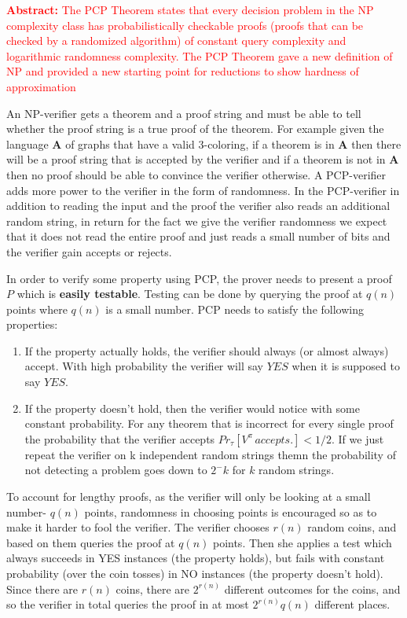 \textcolor{red}{\textbf{Abstract:} The PCP Theorem states that every decision problem in the NP complexity class has probabilistically checkable proofs (proofs that can be checked by a randomized algorithm) of constant query complexity and logarithmic randomness complexity. The PCP Theorem gave a new definition of NP and provided a new starting point for reductions to show hardness of approximation}

An NP-verifier gets a theorem and a proof string and must be able to tell whether the proof string is a true proof of the theorem. For example given the language $\bm{A}$ of graphs that have a valid 3-coloring, if a theorem is in $\bm{A}$ then there will be a proof string that is accepted by the verifier and if a theorem is not in $\bm{A}$ then no proof should be able to convince the verifier otherwise. A PCP-verifier adds more power to the verifier in the form of randomness. In the PCP-verifier in addition to reading the input and the proof the verifier also reads an additional random string, in return for the fact we give the verifier randomness we expect that it does not read the entire proof and just reads a small number of bits and the verifier gain accepts or rejects.

In order to verify some property using PCP, the prover needs to present a proof $P$ which is \textbf{easily testable}. Testing can be done by querying the proof at $q(n)$ points where $q(n)$ is a small number. PCP needs to satisfy the following properties: 
\begin{enumerate}[nolistsep]
    \item If the property actually holds, the verifier should always (or almost always) accept. With high probability the verifier will say $YES$ when it is supposed to say $YES$.
    \item If the property doesn't hold, then the verifier would notice with some constant probability. For any theorem that is incorrect for every single proof the probability that the verifier accepts $Pr_{\tau}[V^{\pi}\,accepts.] < 1/2$. If we just repeat the verifier on k independent random strings themn the probability of not detecting a problem goes down to $2^-k$ for $k$ random strings.
\end{enumerate}

To account for lengthy proofs, as the verifier will only be looking at a small number- $q(n)$ points, randomness in choosing points is encouraged so as to make it harder to fool the verifier. The verifier chooses $r(n)$ random coins, and based on them queries the proof at $q(n)$ points. Then she applies a test which always succeeds in YES instances (the property holds), but fails with constant probability (over the coin tosses) in NO instances (the property doesn't hold). Since there are $r(n)$ coins, there are $2^{r(n)}$ different outcomes for the coins, and so the verifier in total queries the proof in at most $2^{r(n)}q(n)$ different places.

